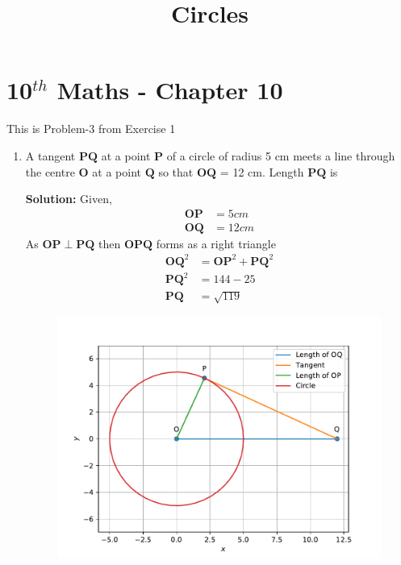 \documentclass[12pt]{article}
\newcommand{\solution}{\noindent \textbf{Solution: }}
\let\vec\mathbf
\begin{document}
\begin{center}
\enlargethispage{-4cm}
\title{\textbf{Circles}}
\date{\vspace{-5ex}} %
\maketitle
\end{center}
\setcounter{page}{1}
\section*{10$^{th}$ Maths - Chapter 10}
This is Problem-3 from Exercise 1
\begin{enumerate}
	\item A tangent $\vec{PQ}$ at a point $\vec{P}$ of a circle of radius 5 cm meets a line through the centre $\vec{O}$ at a point $\vec{Q}$ so that $\vec{OQ}$ = 12 cm. Length $\vec{PQ}$ is

\solution Given,
		\begin{align}
			\vec{OP}&=5cm\\
			\vec{OQ}&=12cm
		\end{align}
		As $\vec{OP}\perp\vec{PQ}$ then $\vec{OPQ}$ forms as a right triangle
		\begin{align}
\vec{OQ}^2&=\vec{OP}^2+\vec{PQ}^2\\
\vec{PQ}^2&=144-25\\
\vec{PQ}&=\sqrt{119}
		\end{align}
\begin{figure}[!h]
\begin{center}
\includegraphics[width=\columnwidth]{figs/fig.pdf}
\end{center}
\caption{}
\label{fig:Fig1}
\end{figure}
\end{enumerate}
\end{document}
